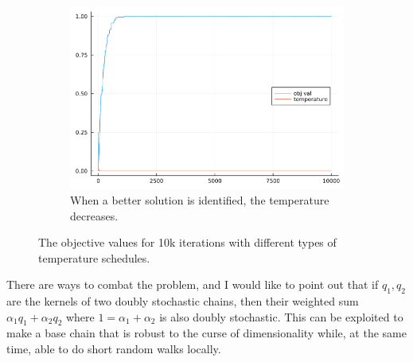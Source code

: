 \documentclass[]{article}
\theoremstyle{definition}
\begin{document}
\begin{figure}[H]
\begin{subfigure}{0.3\textwidth}
                \includegraphics[width=\textwidth]{sa_experiment3.png}
                \caption{When a better solution is identified, the temperature decreases. }
            \end{subfigure}
            \caption{The objective values for 10k iterations with different types of temperature schedules. }
            \label{fig:sa_experiments}
        \end{figure}
        There are ways to combat the problem, and I would like to point out that if $q_1, q_2$ are the kernels of two doubly stochastic chains, then their weighted sum $\alpha_1 q_1 + \alpha_2 q_2$ where $1 = \alpha_1 + \alpha_2$ is also doubly stochastic. This can be exploited to make a base chain that is robust to the curse of dimensionality while, at the same time, able to do short random walks locally. 




\end{document}
